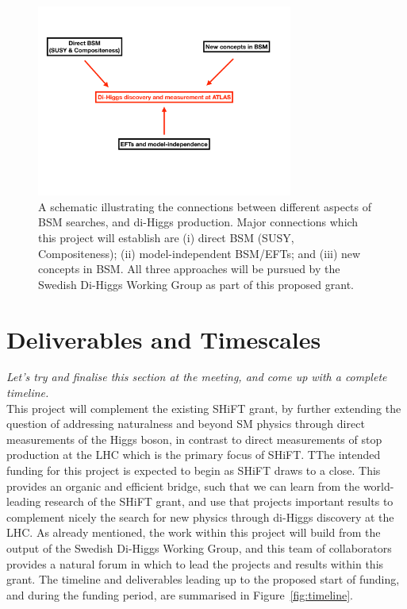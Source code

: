 \documentclass[10pt,oneside,notitlepage,abstracton,a4paper]{scrartcl}
\begin{document}
\begin{figure}[!ht]
\centering
\includegraphics[width=0.75\textwidth]{Figures/ConnectionsAcrossGrant}
\caption{A schematic illustrating the connections between different aspects of BSM searches, and di-Higgs production. Major connections which this project will establish are (i) direct BSM (SUSY, Compositeness); (ii) model-independent BSM/EFTs; and (iii) new concepts in BSM. All three approaches will be pursued by the Swedish Di-Higgs Working Group as part of this proposed grant. }
\label{fig:connections}
\end{figure}

\section{Deliverables and Timescales}

\textit{Let's try and finalise this section at the meeting, and come up with a complete timeline.}\\

This project will complement the existing SHiFT grant, by further extending the question of addressing naturalness and beyond SM physics through direct measurements of the Higgs boson, in contrast to direct measurements of stop production at the LHC which is the primary focus of SHiFT. TThe intended funding for this project is expected to begin as SHiFT draws to a close. This provides an organic and efficient bridge, such that we can learn from the world-leading research of the SHiFT grant, and use that projects important results to complement nicely the search for new physics through di-Higgs discovery at the LHC. As already mentioned, the work within this project will build from the output of the Swedish Di-Higgs Working Group, and this team of collaborators provides a natural forum in which to lead the projects and results within this grant.  The timeline and deliverables leading up to the proposed start of funding, and during the funding period, are summarised in Figure~\ref{fig:timeline}. 
\end{document}

